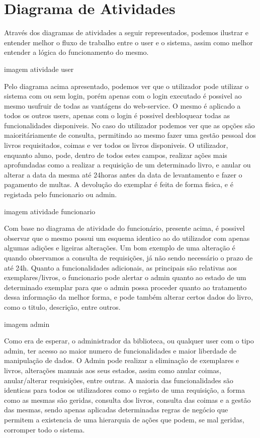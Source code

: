 \section{Diagrama de Atividades}

Através dos diagramas de atividades a seguir representados, podemos ilustrar e entender melhor o fluxo de trabalho entre o user e o sistema, assim como melhor entender a lógica do funcionamento do mesmo.

imagem atividade user

Pelo diagrama acima apresentado, podemos ver que o utilizador pode utilizar o sistema com ou sem login, porém apenas com o login executado é possivel ao mesmo usufruir de todas as vantágens do web-service. O mesmo é aplicado a todos os outros users, apenas com o login é possivel desbloquear todas as funcionalidades disponiveis.
No caso do utilizador podemos ver que as opções são maioritáriamente de consulta, permitindo ao mesmo fazer uma gestão pessoal dos livros requisitados, coimas e ver todos os livros disponiveis.
O utilizador, enquanto aluno, pode, dentro de todos estes campos, realizar ações mais aprofundadas como a realizar a requisição de um determinado livro, e anular ou alterar a data da mesma até 24horas antes da data de levantamento e fazer o pagamento de multas.
A devolução do exemplar é feita de forma fisica, e é registada pelo funcionario ou admin.

imagem atividade funcionario

Com base no diagrama de atividade do funcionário, presente acima, é possivel observar que o mesmo possui um esquema identico ao do utilizador com apenas algumas adições e ligeiras alterações.
Um bom exemplo de uma alteração é quando observamos a consulta de requisições, já não sendo necessário o prazo de até 24h.
Quanto a funcionalidades adicionais, as principais são relativas aos exemplares/livros, o funcionario pode alertar o admin quanto ao estado de um determinado exemplar para que o admin possa proceder quanto ao tratamento dessa informação da melhor forma, e pode também alterar certos dados do livro, como o titulo, descrição, entre outros.

imagem admin

Como era de esperar, o administrador da biblioteca, ou qualquer user com o tipo admin, ter acesso ao maior numero de funcionalidades e maior liberdade de manipulação de dados.
O Admin pode realizar a eliminação de exemplares e livros, alterações manuais aos seus estados, assim como anular coimas, anular/alterar requisições, entre outras.
A maioria das funcionalidades são identicas para todos os utilizadores como o registo de uma requisição, a forma como as mesmas são geridas, consulta dos livros, consulta das coimas e a gestão das mesmas, sendo apenas aplicadas determinadas regras de negócio que permitem a existencia de uma hierarquia de ações que podem, se mal geridas, corromper todo o sistema.
